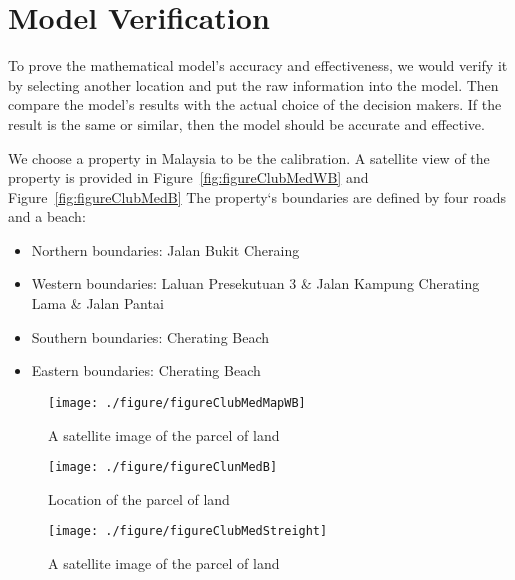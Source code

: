 \documentclass[./main.tex]{subfiles}
\begin{document}
    \section{Model Verification}
    To prove the mathematical model\rq{s} accuracy and effectiveness, we would verify it by selecting another location
    and put the
    raw information into the model.
    Then compare the model\rq{s} results with the actual choice of the decision makers.
    If the result is the same or similar, then the model should be accurate and effective.

    We choose a property in Malaysia to be the calibration.
    A satellite view of the property is provided in Figure~\ref{fig:figureClubMedWB} and Figure~\ref{fig:figureClubMedB}
    The property\lq{s} boundaries are defined by four roads and a beach:
    \begin{itemize}
        \item Northern boundaries: Jalan Bukit Cheraing
        \item Western boundaries: Laluan Presekutuan 3 \& Jalan Kampung Cherating Lama \& Jalan Pantai
        \item Southern boundaries: Cherating Beach
        \item Eastern boundaries: Cherating Beach
    \end{itemize}
    \begin{figure}[H]
        \centering
        \begin{minipage}{0.32\linewidth}
            \centering
            \texttt{[image: ./figure/figureClubMedMapWB]}
            \caption{A satellite image of the parcel of land}
            \label{fig:figureClubMedWB}
        \end{minipage}
        \begin{minipage}{0.32\linewidth}
            \centering
            \texttt{[image: ./figure/figureClunMedB]}
            \caption{Location of the parcel of land}
            \label{fig:figureClubMedB}
        \end{minipage}
        \begin{minipage}{0.32\linewidth}
            \centering
            \centering
            \texttt{[image: ./figure/figureClubMedStreight]}
            \caption{A satellite image of the parcel of land}
            \label{fig:figureClubMedStreight}
        \end{minipage}
    \end{figure}
\end{document}
